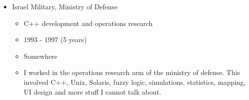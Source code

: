 \documentclass[
]{article}
\providecommand{\tightlist}{%
  \setlength{\itemsep}{0pt}\setlength{\parskip}{0pt}}
\begin{document}
\begin{itemize}
  \begin{itemize}
  \tightlist
  \item
    Generalist
  \item
    1997 - 2001 (4 years)
  \item
    Herzelia, Israel
  \item
    Schema was a genetic algorithms open shop when I came in. We worked
    on Linux with C++ to optimize NP complete problems which come up in
    various industries. I worked on various problems: cargo ship
    loading, missile balancing, cellular frequency assignment and more.
    Ultimately the company turned pure cellular and I was one of the top
    developers of the main product of that company.
  \end{itemize}
\item
  Israel Military, Ministry of Defense

  \begin{itemize}
  \tightlist
  \item
    C++ development and operations research
  \item
    1993 - 1997 (5 years)
  \item
    Somewhere
  \item
    I worked in the operations research arm of the ministry of defense.
    This involved C++, Unix, Solaris, fuzzy logic, simulations,
    statistics, mapping, UI design and more stuff I cannot talk about.
  \end{itemize}
\end{itemize}
\end{document}
